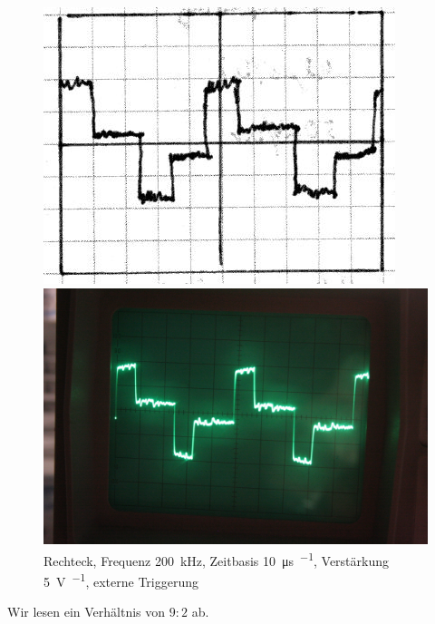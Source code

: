 \begin{figure}
	\centering
	\begin{minipage}{.45\linewidth}
	\includegraphics[width=\linewidth]{Skizzen/IMG_0775-1500.jpg}
	\end{minipage}
	\hfill
	\begin{minipage}{.45\linewidth}
	\includegraphics[width=\linewidth]{Fotos/IMG_0775-1500.jpg}
	\end{minipage}
	\caption{%
		Rechteck, Frequenz \SI{200}{\kilo\hertz},
		Zeitbasis \SI{10}{\micro\second\per\division},
		Verstärkung \SI{5}{\volt\per\division},
		externe Triggerung
	}
	\label{fig:0775}
\end{figure}

Wir lesen ein Verhältnis von $9 : 2$ ab.

